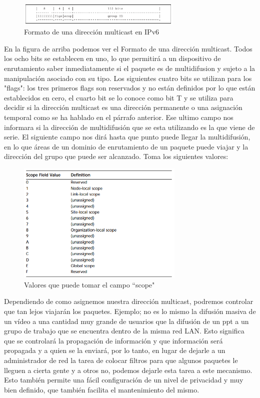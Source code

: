 \documentclass[11pt,a4paper]{article}
\begin{document}
\begin{figure}[h!]
 \centering
 \includegraphics[width=0.7\textwidth]{formato_multicast.png}
 \caption[Formato Multicast]{Formato de una dirección multicast en IPv6}
\end{figure} \par
En la figura de arriba podemos ver el Formato de una dirección multicast. Todos los ocho bits se 
establecen en uno, lo que permitirá a un dispositivo de enrutamiento saber inmediatamente si el 
paquete es de multidifusion y sujeto a la manipulación asociado con su tipo. Los siguientes cuatro 
bits se utilizan para los "flags": los tres primeros flags son reservados y no están definidos por 
lo que están establecidos en cero, el cuarto bit se lo conoce como bit T y se utiliza para decidir 
si la dirección multicast es una dirección permanente o una asignación temporal como se ha hablado 
en el párrafo anterior. Ese ultimo campo nos informara si la dirección de multidifusión que se esta 
utilizando es la que viene de serie. El siguiente campo nos dirá hasta que punto puede llegar la 
multidifusión, en lo que áreas de un dominio de enrutamiento de un paquete puede viajar y la 
dirección del grupo que puede ser alcanzado. Toma los siguientes valores:\par

\begin{figure}[h!]
 \centering
 \includegraphics[width=0.71\textwidth]{valoresM.png}
 \caption[Valores del campo scope]{Valores que puede tomar el campo ``scope"}
\end{figure} \par

Dependiendo de como asignemos nuestra dirección multicast, podremos controlar que tan lejos viajarán 
los paquetes. Ejemplo; no es lo mismo la difusión masiva de un vídeo a una cantidad muy grande de 
usuarios que la difusión de un ppt a un grupo de trabajo que se encuentra dentro de la misma red 
LAN. Esto significa que se controlará la propagación de información y que información será propagada 
y a quien se la enviará, por lo tanto, en lugar de dejarle a un administrador de red la tarea de 
colocar filtros para que algunos paquetes le lleguen a cierta gente y a otros no, podemos dejarle 
esta tarea a este mecanismo. Esto también permite una fácil configuración de un nivel de privacidad 
y muy bien definido, que también facilita el mantenimiento del mismo.
\end{document}
